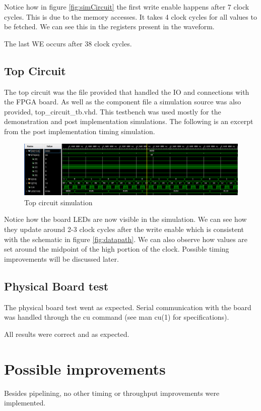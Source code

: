 \documentclass[12pt]{article}
\begin{document}
Notice how in figure \ref{fig:simCircuit} the first write enable happens after 7 clock cycles. This is due to the memory accesses. It takes 4 clock cycles for all values to be fetched. We can see this in the registers present in the waveform.

The last WE occurs after 38 clock cycles.

\subsection{Top Circuit}
The top circuit was the file provided that handled the IO and connections with the FPGA board. As well as the component file a simulation source was also provided, top\_circuit\_tb.vhd. 
This testbench was used mostly for the demonstration and post implementation simulations. The following is an excerpt from the post implementation timing simulation.


\begin{figure}[!htp]
	\centering
	\includegraphics[width=0.7\linewidth]{images/simTopCircuit.png}
	\caption{Top circuit simulation}
	\label{fig:simTopCircuit}
\end{figure}

Notice how the board LEDs are now visible in the simulation. We can see how they update around 2-3 clock cycles after the write enable which is consistent with the schematic in figure \ref{fig:datapath}.
We can also observe how values are set around the midpoint of the high portion of the clock. Possible timing improvements will be discussed later.

\subsection{Physical Board test}
The physical board test went as expected.
Serial communication with the board was handled through the cu command (see man cu(1) for specifications).

All results were correct and as expected.

\section{Possible improvements}
Besides pipelining, no other timing or throughput improvements were implemented.
\end{document}
